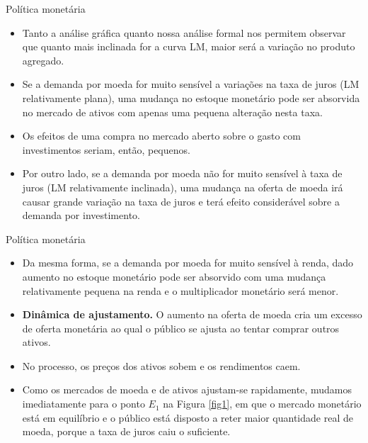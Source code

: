 \documentclass[10pt]{beamer}
\begin{document}
\begin{frame}{Política monetária}
\begin{itemize}
    \item Tanto a análise gráfica quanto nossa análise formal nos permitem observar que quanto mais inclinada for a curva LM, maior será a variação no produto agregado.
    \bigskip
    \item Se a demanda por moeda for muito sensível a variações na taxa de juros (LM relativamente plana), uma mudança no estoque monetário pode ser absorvida no mercado de ativos com apenas uma pequena alteração nesta taxa.
    \bigskip
    \item Os efeitos de uma compra no mercado aberto sobre o gasto com investimentos seriam, então, pequenos.
    \bigskip
    \item Por outro lado, se a demanda por moeda não for muito sensível à taxa de juros (LM relativamente inclinada), uma mudança na oferta de moeda irá causar grande variação na taxa de juros e terá efeito considerável sobre a demanda por investimento.
\end{itemize}
\end{frame}

\begin{frame}{Política monetária}
\begin{itemize}
    \item Da mesma forma, se a demanda por moeda for muito sensível à renda, dado aumento no estoque monetário pode ser absorvido com uma mudança relativamente pequena na renda e o multiplicador monetário será menor.
    \bigskip
    \item \textbf{Dinâmica de ajustamento.} O aumento na oferta de moeda cria um excesso de oferta monetária ao qual o público se ajusta ao tentar comprar outros ativos.
    \bigskip
    \item No processo, os preços dos ativos sobem e os rendimentos caem.
    \bigskip
    \item Como os mercados de moeda e de ativos ajustam-se rapidamente, mudamos imediatamente para o ponto $E_1$ na Figura \ref{fig1}, em que o mercado monetário está em equilíbrio e o público está disposto a reter maior quantidade real de moeda, porque a taxa de juros caiu o suficiente.
\end{itemize}
\end{frame}
\end{document}
